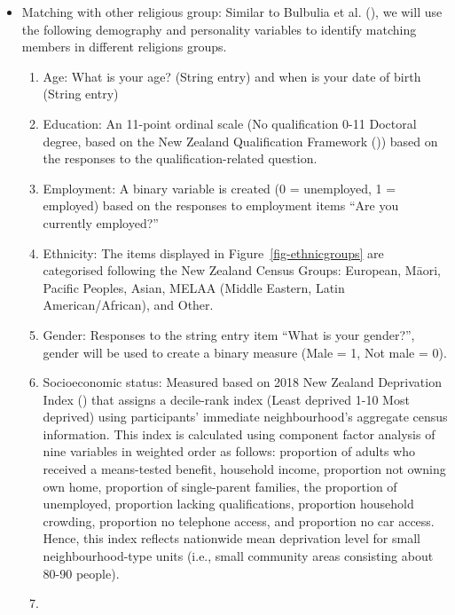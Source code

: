 \documentclass[
  man,
  longtable,
  nolmodern,
  notxfonts,
  notimes,
  colorlinks=true,linkcolor=blue,citecolor=blue,urlcolor=blue]{apa7}
\begin{document}
\begin{itemize}
\item
  Matching with other religious group: Similar to Bulbulia et al.
  (), we will use the following
  demography and personality variables to identify matching members in
  different religions groups.

  \begin{enumerate}
  \def\labelenumi{\arabic{enumi}.}
  \item
    Age: What is your age? (String entry) and when is your date of birth
    (String entry)
  \item
    Education: An 11-point ordinal scale (No qualification 0-11 Doctoral
    degree, based on the New Zealand Qualification Framework
    ()) based on the responses to the
    qualification-related question.
  \item
    Employment: A binary variable is created (0 = unemployed, 1 =
    employed) based on the responses to employment items ``Are you
    currently employed?''
  \item
    Ethnicity: The items displayed in Figure~\ref{fig-ethnicgroups} are
    categorised following the New Zealand Census Groups: European,
    Māori, Pacific Peoples, Asian, MELAA (Middle Eastern, Latin
    American/African), and Other.
  \item
    Gender: Responses to the string entry item ``What is your gender?'',
    gender will be used to create a binary measure (Male = 1, Not male =
    0).
  \item
    Socioeconomic status: Measured based on 2018 New Zealand Deprivation
    Index () that
    assigns a decile-rank index (Least deprived 1-10 Most deprived)
    using participants' immediate neighbourhood's aggregate census
    information. This index is calculated using component factor
    analysis of nine variables in weighted order as follows: proportion
    of adults who received a means-tested benefit, household income,
    proportion not owning own home, proportion of single-parent
    families, the proportion of unemployed, proportion lacking
    qualifications, proportion household crowding, proportion no
    telephone access, and proportion no car access. Hence, this index
    reflects nationwide mean deprivation level for small
    neighbourhood-type units (i.e., small community areas consisting
    about 80-90 people).
  \item

\end{enumerate}
\end{itemize}
\end{document}
